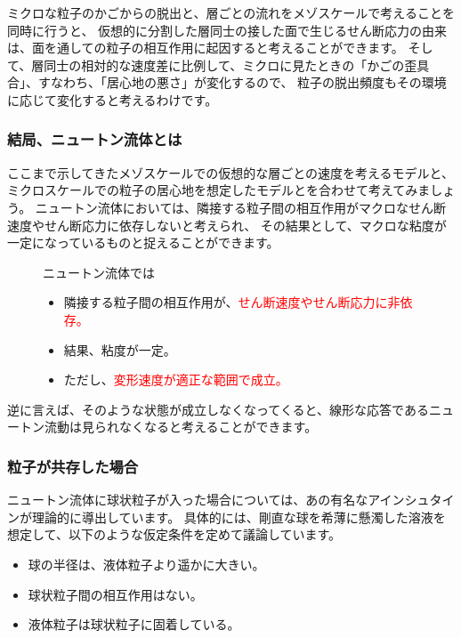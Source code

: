 \documentclass[uplatex,dvipdfmx,a4paper,11pt]{jsreport}
\begin{document}
ミクロな粒子のかごからの脱出と、層ごとの流れをメゾスケールで考えることを同時に行うと、
仮想的に分割した層同士の接した面で生じるせん断応力の由来は、面を通しての粒子の相互作用に起因すると考えることができます。
そして、層同士の相対的な速度差に比例して、ミクロに見たときの「かごの歪具合」、すなわち、「居心地の悪さ」が変化するので、
粒子の脱出頻度もその環境に応じて変化すると考えるわけです。

\subsubsection{結局、ニュートン流体とは}

ここまで示してきたメゾスケールでの仮想的な層ごとの速度を考えるモデルと、
ミクロスケールでの粒子の居心地を想定したモデルとを合わせて考えてみましょう。
ニュートン流体においては、隣接する粒子間の相互作用がマクロなせん断速度やせん断応力に依存しないと考えられ、
その結果として、マクロな粘度が一定になっているものと捉えることができます。

\begin{figure}[htb]
	\begin{center}
		\begin{minipage}{0.9\textwidth}
			\begin{itembox}[l]{ニュートン流体では}
				\begin{itemize}
					\item 隣接する粒子間の相互作用が、\textcolor{red}{せん断速度やせん断応力に非依存。}
					\item 結果、粘度が一定。
					\item ただし、\textcolor{red}{変形速度が適正な範囲で成立。}
				\end{itemize}
			\end{itembox}
		\end{minipage}
	\end{center}
\end{figure}

逆に言えば、そのような状態が成立しなくなってくると、線形な応答であるニュートン流動は見られなくなると考えることができます。

\subsubsection{粒子が共存した場合}

ニュートン流体に球状粒子が入った場合については、あの有名なアインシュタインが理論的に導出しています。
具体的には、剛直な球を希薄に懸濁した溶液を想定して、以下のような仮定条件を定めて議論しています。
\begin{itemize}
	\item 球の半径は、液体粒子より遥かに大きい。
	\item 球状粒子間の相互作用はない。
	\item 液体粒子は球状粒子に固着している。
\end{itemize}
\end{document}
